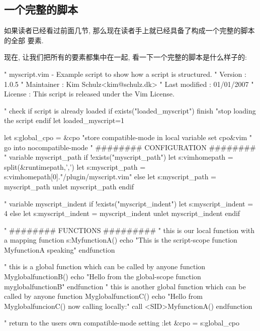 \subsection{一个完整的脚本}
\label{subsec:putting_it_all_together}

如果读者已经看过前面几节, 那么现在读者手上就已经具备了构成一个完整的脚本的全部
要素.

现在, 让我们把所有的要素都集中在一起, 看一下一个完整的脚本是什么样子的:
\begin{vimcode}
" myscript.vim  - Example script to show how a script is structured.
" Version       : 1.0.5
" Maintainer    : Kim Schulz<kim@schulz.dk>
" Last modified : 01/01/2007
" License       : This script is released under the Vim License.

" check if script is already loaded
if exists("loaded_myscript")
	finish "stop loading the script
endif
let loaded_myscript=1
\end{vimcode}
\begin{vimcode}

	let s:global_cpo = &cpo  "store compatible-mode in local variable
	set cpo&vim              " go into nocompatible-mode
" ######## CONFIGURATION ########
" variable myscript_path
if !exists("myscript_path")
	let s:vimhomepath = split(&runtimepath,',')
	let s:myscript_path = s:vimhomepath[0]."/plugin/myscript.vim"
else
	let s:myscript_path = myscript_path
	unlet myscript_path
endif

" variable myscript_indent
if !exists("myscript_indent")
	let s:myscript_indent = 4
else
	let s:myscript_indent = myscript_indent
	unlet myscript_indent
endif

	" ######## FUNCTIONS #########
	" this is our local function with a mapping
function s:MyfunctionA()
	echo "This is the script-scope function MyfunctionA speaking"
endfunction

" this is a global function which can be called by anyone
function MyglobalfunctionB()
	echo "Hello from the global-scope function myglobalfunctionB"
endfunction
" this is another global function which can be called by anyone
function MyglobalfunctionC()
	echo "Hello from MyglobalfuncionC() now calling locally:"
	call <SID>MyfunctionA()
endfunction

" return to the users own compatible-mode setting
:let &cpo = s:global_cpo
\end{vimcode}
